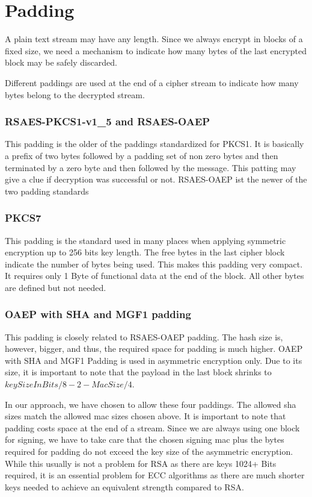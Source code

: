 \section{Padding}
A plain text stream may have any length. Since we always encrypt in blocks of a fixed size, we need a mechanism to indicate how many bytes of the last encrypted block may be safely discarded. 

Different paddings are used at the end of a cipher stream to indicate how many bytes belong to the decrypted stream.

\subsubsection{RSAES-PKCS1-v1\_5 and RSAES-OAEP}
This padding is the older of the paddings standardized for PKCS1. It is basically a prefix of two bytes followed by a padding set of non zero bytes and then terminated by a zero byte and then followed by the message. This patting may give a clue if decryption was successful or not. RSAES-OAEP ist the newer of the two padding standards 

\subsubsection{PKCS7} 
This padding is the standard used in many places when applying symmetric encryption up to 256 bits key length. The free bytes in the last cipher block indicate the number of bytes being used. This makes this padding very compact. It requires only 1 Byte of functional data at the end of the block. All other bytes are defined but not needed.

\subsubsection{OAEP with SHA and MGF1 padding} 
This padding is closely related to RSAES-OAEP padding. The hash size is, however, bigger, and thus, the required space for padding is much higher. OAEP with SHA and MGF1 Padding is used in asymmetric encryption only. Due to its size, it is important to note that the payload in the last block shrinks to $keySizeInBits/8-2-MacSize/4$.

In our approach, we have chosen to allow these four paddings. The allowed sha sizes match the allowed mac sizes chosen above. It is important to note that padding costs space at the end of a stream. Since we are always using one block for signing, we have to take care that the chosen signing mac plus the bytes required for padding do not exceed the key size of the asymmetric encryption. While this usually is not a problem for RSA as there are keys 1024+ Bits required, it is an essential problem for ECC algorithms as there are much shorter keys needed to achieve an equivalent strength compared to RSA. 

